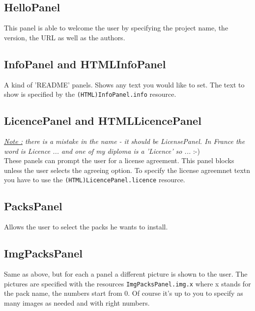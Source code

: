 \subsection{HelloPanel}

This panel is able to welcome the user by specifying the project name, the
version, the URL as well as the authors.\\

\subsection{InfoPanel and HTMLInfoPanel}

A kind of 'README' panels. Shows any text you would like to set. The text to
show is specified by the \texttt{(HTML)InfoPanel.info} resource.\\

\subsection{LicencePanel and HTMLLicencePanel}

\noindent
\textit{\underline{Note :} there is a mistake in the name - it should be
LicensePanel. In France the word is Licence ... and one of my diploma is a
'Licence' so ...} :-)\\

These panels can prompt the user for a license agreement. This panel blocks
unless the user selects the agreeing option. To specify the license agreemnet
textn you have to use the \texttt{(HTML)LicencePanel.licence} resource.\\

\subsection{PacksPanel}

Allows the user to select the packs he wants to install.\\

\subsection{ImgPacksPanel}

Same as above, but for each a panel a different picture is shown to the user.
The pictures are specified with the resources \texttt{ImgPacksPanel.img.x} where
x stands for the pack name, the numbers start from 0. Of course it's up to you
to specify as many images as needed and with right numbers.\\

